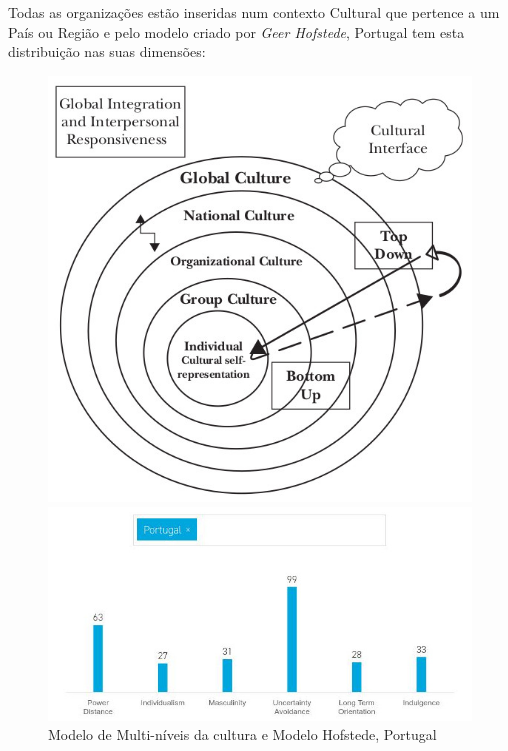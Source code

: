 \newpage
Todas as organizações estão inseridas num contexto Cultural que pertence a um País ou Região e pelo modelo criado por \textit{Geer Hofstede}, Portugal tem esta distribuição nas suas dimensões:
\begin{figure}[H]
\begin{minipage}{0.3\textwidth}
\flushleft
\includegraphics[scale=0.30]{./image/OB/OB_MUltilevelmodelCulture.jpg}
\end{minipage}
\hspace{.3cm}
\begin{minipage}{0.4\textwidth}
\flushleft
\includegraphics[scale=0.45]{./image/OB/Hofstede_pt.jpg}
\end{minipage}
\caption{Modelo de Multi-níveis \cite{book_11} da cultura e Modelo Hofstede, Portugal}
\end{figure}
